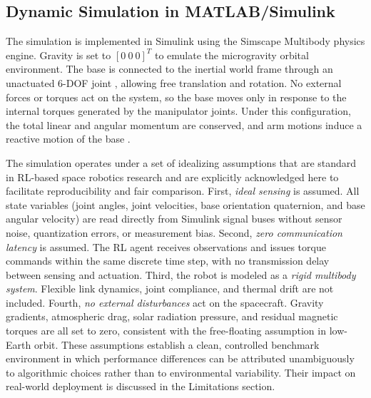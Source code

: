 \documentclass{ieeeaccess}
\begin{document}
\subsection{Dynamic Simulation in MATLAB/Simulink} The simulation is implemented in Simulink using the
Simscape Multibody physics engine. Gravity is set to $[0~0~0]^T$ to emulate the microgravity
orbital environment. The base is connected to the inertial world frame through an unactuated
6-DOF joint \cite{b3}, allowing free translation and rotation. No external forces or torques act
on
the system, so the base moves only in response to the internal torques generated
by the manipulator joints. Under this configuration, the total linear and angular momentum are
conserved, and arm motions induce a reactive motion of the base \cite{b3,b6,b28,b34,kaigom2011optimal}.

The simulation operates under a set of idealizing assumptions that are standard in RL-based
space robotics research and are explicitly acknowledged here to facilitate reproducibility and fair comparison.
First, \emph{ideal sensing} is assumed. All state variables (joint angles, joint velocities, base orientation
quaternion, and base angular velocity) are read directly from Simulink signal buses without sensor
noise, quantization errors, or measurement bias. Second, \emph{zero communication latency} is assumed. The RL
agent receives observations and issues torque commands within the same discrete time step, with
no transmission delay between sensing and actuation. Third, the robot is modeled as a
\emph{rigid multibody system}. Flexible link dynamics, joint compliance, and thermal drift are not included.
Fourth, \emph{no external disturbances} act on the spacecraft. Gravity gradients, atmospheric drag, solar radiation
pressure, and residual magnetic torques are all set to zero, consistent with the free-floating
assumption in low-Earth orbit. These assumptions establish a clean, controlled benchmark environment in which
performance differences can be attributed unambiguously to algorithmic choices rather than to environmental variability.
Their impact on real-world deployment is discussed in the Limitations section.
\end{document}
